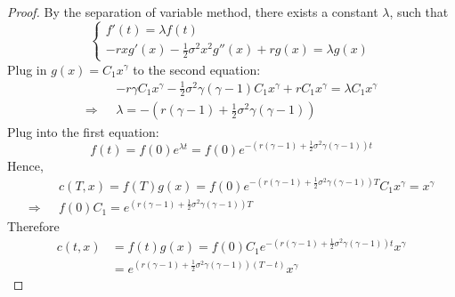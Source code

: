 \documentclass[a4paper, 10pt]{article}
\theoremstyle{definition}
\theoremstyle{hSol}
\begin{document}
\begin{proof}
By the separation of variable method, there exists a constant $\lambda$, such that
\begin{equation}
	\begin{cases}
	f'(t) = \lambda f(t) \\
	-rxg'(x) - \frac{1}{2}\sigma^2 x^2 g''(x) + rg(x) = \lambda g(x)
	\end{cases}
\end{equation}
Plug in $g(x)=C_1x^{\gamma}$ to the second equation:
\begin{equation}
	\begin{split}
		&-r \gamma C_1 x^\gamma - \frac{1}{2}\sigma^2 \gamma(\gamma-1)C_1x^{\gamma} + rC_1 x^{\gamma} = \lambda C_1 x^{\gamma} \\
		\Rightarrow~~~& \lambda = -\left(r(\gamma-1) + \frac{1}{2}\sigma^2\gamma(\gamma-1)\right)
	\end{split}
\end{equation}
Plug into the first equation:
\begin{equation}
	f(t) = f(0) e^{\lambda t} = f(0)e^{-\left(r(\gamma-1) + \frac{1}{2}\sigma^2\gamma(\gamma-1)\right)t}
\end{equation}
Hence,
\begin{equation}
	\begin{split}
		&c(T,x) = f(T)g(x) =f(0)e^{-\left(r(\gamma-1) + \frac{1}{2}\sigma^2\gamma(\gamma-1)\right)T}C_1 x^{\gamma} = x^{\gamma} \\
		\Rightarrow ~~~& f(0)C_1 = e^{\left(r(\gamma-1) + \frac{1}{2}\sigma^2\gamma(\gamma-1)\right)T}
	\end{split}
\end{equation}
Therefore
\begin{equation}
	\begin{split}
		c(t,x) &= f(t)g(x) = f(0)C_1e^{-\left(r(\gamma-1) + \frac{1}{2}\sigma^2\gamma(\gamma-1)\right)t} x^{\gamma} \\
		&= e^{\left(r(\gamma-1) + \frac{1}{2}\sigma^2\gamma(\gamma-1)\right)(T-t)} x^{\gamma}
	\end{split}
\end{equation}
\end{proof}
\end{document}
